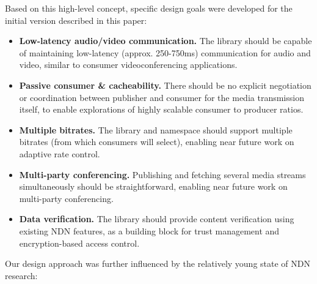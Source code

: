 \documentclass{icn/sig-alternate-2013} %
\begin{document}
Based on this high-level concept, specific design goals were developed for the initial version described in this paper: 


\begin{itemize}

\item \textbf{Low-latency audio/video communication.} The library should be capable of maintaining low-latency (approx. 250-750ms) communication for audio and video, similar to consumer videoconferencing applications.

\item \textbf{Passive consumer \& cacheability.} There should be no explicit negotiation or coordination between publisher and consumer for the media transmission itself, to enable explorations of highly scalable consumer to producer ratios.  

\item \textbf{Multiple bitrates.} The library and namespace should support multiple bitrates (from which consumers will select), enabling near future
work on adaptive rate control. 

\item \textbf{Multi-party conferencing.} Publishing and fetching several media streams simultaneously should be straightforward, enabling near future work on 
 multi-party conferencing. 

\item \textbf{Data verification.} The library should provide content verification using existing NDN features, as a building block for trust management and encryption-based access control.  

\end{itemize} 


Our design approach was further influenced by the relatively young state of NDN research: 
\end{document}
